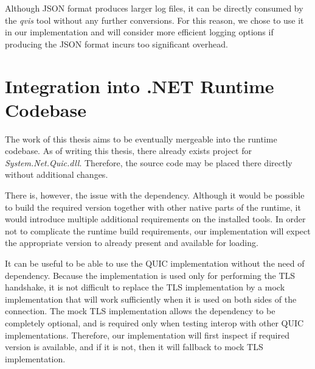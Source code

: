 Although JSON format produces larger log files, it can be directly consumed by the \textit{qvis}
tool without any further conversions. For this reason, we chose to use it in our implementation and
will consider more efficient logging options if producing the JSON format incurs too significant
overhead.

\section{Integration into .NET Runtime Codebase}

The work of this thesis aims to be eventually mergeable into the \dotnet{} runtime codebase. As of
writing this thesis, there already exists project for \textit{System.Net.Quic.dll}. Therefore, the
source code may be placed there directly without additional changes.

There is, however, the issue with the \libopenssl{} dependency. Although it would be possible to
build the required \libopenssl{} version together with other native parts of the \dotnet{} runtime,
it would introduce multiple additional requirements on the installed tools. In order not to
complicate the runtime build requirements, our implementation will expect the appropriate
\libopenssl{} version to already present and available for loading.

It can be useful to be able to use the QUIC implementation without the need of \libopenssl{}
dependency. Because the \libopenssl{} implementation is used only for performing the TLS handshake,
it is not difficult to replace the TLS implementation by a mock implementation that will work
sufficiently when it is used on both sides of the connection. The mock TLS implementation allows the
\libopenssl{} dependency to be completely optional, and is required only when testing interop with
other QUIC implementations. Therefore, our implementation will first inspect if required
\libopenssl{} version is available, and if it is not, then it will fallback to mock TLS
implementation.
